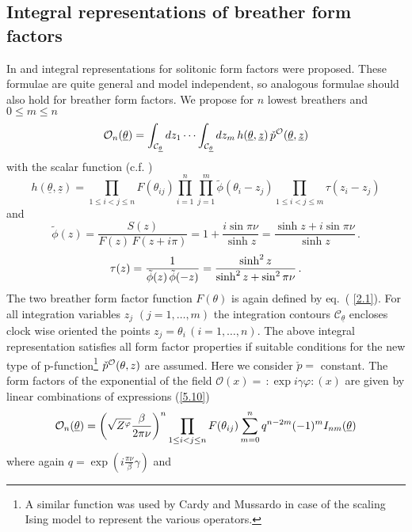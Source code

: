 \documentclass[a4paper,a4paper]{article}
\begin{document}
\subsection{Integral representations of breather form factors\label{s6.2}}

In \cite{BFKZ} and \cite{BK} integral representations for solitonic form
factors were proposed. These formulae are quite general and model
independent, so analogous formulae should also hold for breather form
factors. We propose for $n$ lowest breathers and $0\leq m\leq n$ 
\begin{equation}
\mathcal{O}_{n}(\underline{\theta })=\int_{\mathcal{C}_{\underline{\theta }%
}}dz_{1}\cdots \int_{\mathcal{C}_{\underline{\theta }}}dz_{m}\,h(\underline{%
\theta },{\underline{z}})\,\check{p}^{\mathcal{O}}(\underline{\theta },{%
\underline{z}})  \label{5.10}
\end{equation}
with the scalar function (c.f. \cite{BFKZ}) 
\[
h(\underline{\theta },{\underline{z}})=\prod_{1\le i<j\le n}F(\theta
_{ij})\prod_{i=1}^{n}\prod_{j=1}^{m}\tilde{\phi}(\theta
_{i}-z_{j})\prod_{1\le i<j\le m}\tau (z_{i}-z_{j}) 
\]
and 
\[
\tilde{\phi}(z)=\frac{S(z)}{F(z)\,F(z+i\pi )}=1+\frac{i\sin \pi \nu }{\sinh z%
}=\frac{\sinh z+i\sin \pi \nu }{\sinh z}\,. 
\]
\[
\tau (z)=\frac{1}{\tilde{\phi}(z)\,\tilde{\phi}(-z)}=\frac{\sinh ^{2}z}{%
\sinh ^{2}z+\sin ^{2}\pi \nu }\,. 
\]
The two breather form factor function $F(\theta )$ is again defined by eq.~(%
\ref{2.1}). For all integration variables $z_{j}$ $(j=1,\dots ,m)$ the
integration contours $\mathcal{C}_{\underline{\theta }}$ encloses clock wise
oriented the points $z_{j}=\theta _{i}\,(i=1,\dots ,n)$. The above integral
representation satisfies all form factor properties if suitable conditions
for the new type of p-function\footnote{%
A similar function was used by Cardy and Mussardo \cite{CM} in case of the
scaling Ising model to represent the various operators.} $\check{p}^{%
\mathcal{O}}(\theta ,z)$ are assumed. Here we consider $\check{p}=$
constant. The form factors of the exponential of the field $\mathcal{O}%
(x)=\,:\!\exp i\gamma \varphi \!:\!(x)$ are given by linear combinations of
expressions (\ref{5.10}) 
\begin{equation}
\mathcal{O}_{n}(\underline{\theta })=\left( \sqrt{Z^{\varphi }}\frac{\beta }{%
2\pi \nu }\right) ^{n}\prod_{1\leq i<j\leq n}F(\theta
_{ij})\sum_{m=0}^{n}q^{n-2m}(-1)^{m}I_{nm}(\underline{\theta })  \label{5.11}
\end{equation}
where again $q=\exp \left( i\frac{\pi \nu }{\beta }\gamma \right) $ and 
\end{document}
